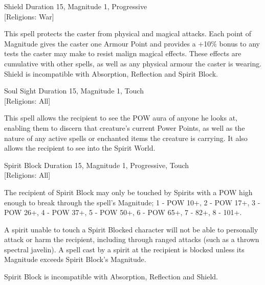 \begin{rpg-spell}
{Shield}
{Duration 15, Magnitude 1, Progressive\\{[Religions: War]}}

This spell protects the caster from physical and magical attacks. Each point of Magnitude gives the caster one Armour Point and provides a +10\% bonus to any tests the caster may make to resist malign magical effects. These effects are cumulative with other spells, as well as any physical armour the caster is wearing. Shield is incompatible with Absorption, Reflection and Spirit Block. 
\end{rpg-spell}

\begin{rpg-spell}
{Soul Sight}
{Duration 15, Magnitude 1, Touch\\{[Religions: All]}}

This spell allows the recipient to see the POW aura of anyone he looks at, enabling them to discern that creature’s current Power Points, as well as the nature of any active spells or enchanted items the creature is carrying. It also allows the recipient to see into the Spirit World. 
\end{rpg-spell}

\begin{rpg-spell}
{Spirit Block}
{Duration 15, Magnitude 1, Progressive, Touch\\{[Religions: All]}}

The recipient of Spirit Block may only be touched by Spirits with a POW high enough to break through the spell’s Magnitude; 1 - POW 10+, 2 - POW 17+, 3 - POW 26+, 4 - POW 37+, 5 - POW 50+, 6 - POW 65+, 7 - 82+, 8 - 101+.

A spirit unable to touch a Spirit Blocked character will not be able to personally attack or harm the recipient, including through ranged attacks (such as a thrown spectral javelin). A spell cast by a spirit at the recipient is blocked unless its Magnitude exceeds Spirit Block’s Magnitude. 

Spirit Block is incompatible with Absorption, Reflection and Shield. 
\end{rpg-spell}

